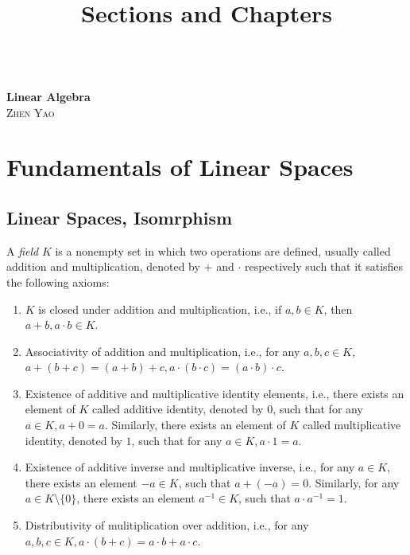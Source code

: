 \documentclass[11pt]{book}
\title{Sections and Chapters}
\theoremstyle{definition}
\numberwithin{equation}{chapter}
\begin{document}
\frontmatter

\begin{titlepage}
	\begin{center}
	\textbf{\LARGE{}} \\
	\vspace{40mm}
    \textbf{\Huge{Linear Algebra}} \\
    \vspace{10mm} %
    \large{\textsc{Zhen Yao}}\\
    \large{\textsc{}}
    \end{center}
\end{titlepage}

\tableofcontents{}
\mainmatter

\newpage

\chapter{Fundamentals of Linear Spaces}
\section{Linear Spaces, Isomrphism}

A \emph{field} $K$ is a nonempty set in which two operations are defined, usually called addition and multiplication, denoted by $+$ and $\cdot$ respectively such that it satisfies the following axioms:
\begin{enumerate}[label=(\arabic*)]
    \item $K$ is closed under addition and multiplication, i.e., if $a,b\in K$, then $a+b, a\cdot b\in K$.
    \item Associativity of addition and multiplication, i.e., for any $a,b,c\in K$, $a+(b+c) = (a+b)+c, a\cdot(b\cdot c) = (a\cdot b)\cdot c$.
    \item Existence of additive and multiplicative identity elements, i.e., there exists an element of $K$ called additive identity, denoted by $0$, such that for any $a
    \in K, a+0=a$. Similarly, there exists an element of $K$ called multiplicative identity, denoted by $1$, such that for any $a\in K, a\cdot 1=a$.
    \item Existence of additive inverse and multiplicative inverse, i.e., for any $a\in K$, there exists an element $-a\in K$, such that $a+(-a)=0$. Similarly, for any $a\in K\setminus \{0\}$, there exists an element $a^{-1}\in K$, such that $a\cdot a^{-1}=1$.
    \item Distributivity of mulitiplication over addition, i.e., for any $a,b,c\in K, a\cdot(b+c)=a\cdot b+a\cdot c$.
\end{enumerate}
\end{document}
